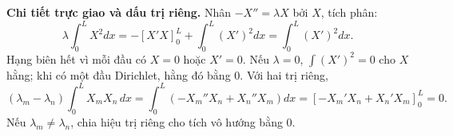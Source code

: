 \documentclass[10pt,a4paper]{article}
\begin{document}
\textbf{Chi tiết trực giao và dấu trị riêng.} Nhân $-X''=\lambda X$ bởi $X$, tích phân:
\[\lambda\int_0^LX^2dx=-[X'X]_0^L+\int_0^L(X')^2dx=\int_0^L(X')^2dx.\]
Hạng biên hết vì mỗi đầu có $X=0$ hoặc $X'=0$. Nếu $\lambda=0$, $\int(X')^2=0$ cho $X$ hằng; khi có một đầu Dirichlet, hằng đó bằng $0$. Với hai trị riêng,
\[(\lambda_m-\lambda_n)\int_0^LX_mX_n\,dx
=\int_0^L(-X_m''X_n+X_n''X_m)dx
=[-X_m'X_n+X_n'X_m]_0^L=0.\]
Nếu $\lambda_m\ne\lambda_n$, chia hiệu trị riêng cho tích vô hướng bằng $0$.
\end{document}
